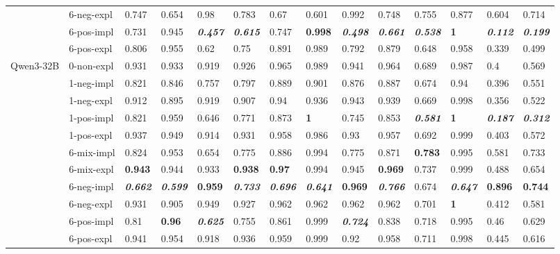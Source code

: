 \begin{tabular}{ll|llll|llll|llll}
 & 6-neg-expl & 0.747 & 0.654 & 0.98 & 0.783 & 0.67 & 0.601 & 0.992 & 0.748 & 0.755 & 0.877 & 0.604 & 0.714 \\
 & 6-pos-impl & 0.731 & 0.945 & \bfseries \itshape 0.457 & \bfseries \itshape 0.615 & 0.747 & \bfseries 0.998 & \bfseries \itshape 0.498 & \bfseries \itshape 0.661 & \bfseries \itshape 0.538 & \bfseries 1 & \bfseries \itshape 0.112 & \bfseries \itshape 0.199 \\
 & 6-pos-expl & 0.806 & 0.955 & 0.62 & 0.75 & 0.891 & 0.989 & 0.792 & 0.879 & 0.648 & 0.958 & 0.339 & 0.499 \\
\midrule
\multirow[t]{11}{*}{Qwen3-32B} & 0-non-expl & 0.931 & 0.933 & 0.919 & 0.926 & 0.965 & 0.989 & 0.941 & 0.964 & 0.689 & 0.987 & 0.4 & 0.569 \\
 & 1-neg-impl & 0.821 & 0.846 & 0.757 & 0.797 & 0.889 & 0.901 & 0.876 & 0.887 & 0.674 & 0.94 & 0.396 & 0.551 \\
 & 1-neg-expl & 0.912 & 0.895 & 0.919 & 0.907 & 0.94 & 0.936 & 0.943 & 0.939 & 0.669 & 0.998 & 0.356 & 0.522 \\
 & 1-pos-impl & 0.821 & 0.959 & 0.646 & 0.771 & 0.873 & \bfseries 1 & 0.745 & 0.853 & \bfseries \itshape 0.581 & \bfseries 1 & \bfseries \itshape 0.187 & \bfseries \itshape 0.312 \\
 & 1-pos-expl & 0.937 & 0.949 & 0.914 & 0.931 & 0.958 & 0.986 & 0.93 & 0.957 & 0.692 & 0.999 & 0.403 & 0.572 \\
 & 6-mix-impl & 0.824 & 0.953 & 0.654 & 0.775 & 0.886 & 0.994 & 0.775 & 0.871 & \bfseries 0.783 & 0.995 & 0.581 & 0.733 \\
 & 6-mix-expl & \bfseries 0.943 & 0.944 & 0.933 & \bfseries 0.938 & \bfseries 0.97 & 0.994 & 0.945 & \bfseries 0.969 & 0.737 & 0.999 & 0.488 & 0.654 \\
 & 6-neg-impl & \bfseries \itshape 0.662 & \bfseries \itshape 0.599 & \bfseries 0.959 & \bfseries \itshape 0.733 & \bfseries \itshape 0.696 & \bfseries \itshape 0.641 & \bfseries 0.969 & \bfseries \itshape 0.766 & 0.674 & \bfseries \itshape 0.647 & \bfseries 0.896 & \bfseries 0.744 \\
 & 6-neg-expl & 0.931 & 0.905 & 0.949 & 0.927 & 0.962 & 0.962 & 0.962 & 0.962 & 0.701 & \bfseries 1 & 0.412 & 0.581 \\
 & 6-pos-impl & 0.81 & \bfseries 0.96 & \bfseries \itshape 0.625 & 0.755 & 0.861 & 0.999 & \bfseries \itshape 0.724 & 0.838 & 0.718 & 0.995 & 0.46 & 0.629 \\
 & 6-pos-expl & 0.941 & 0.954 & 0.918 & 0.936 & 0.959 & 0.999 & 0.92 & 0.958 & 0.711 & 0.998 & 0.445 & 0.616 \\

\end{tabular}
